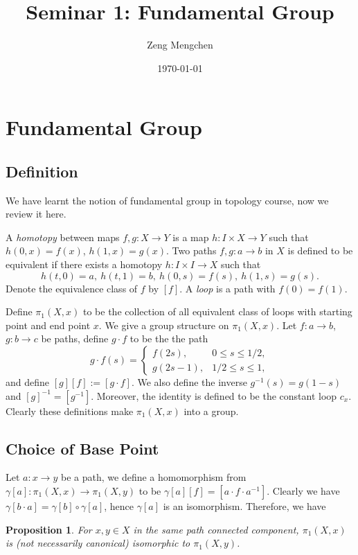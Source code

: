 \documentclass[a4paper]{amsart}
\title{Seminar 1: Fundamental Group}
\author{Zeng Mengchen}
\date{\today}
\theoremstyle{plain}
\newtheorem{prop}[thm]{Proposition}
\theoremstyle{definition}
\theoremstyle{remark}
\begin{document}
\maketitle

\section{Fundamental Group}

\subsection{Definition}
We have learnt the notion of fundamental group in topology course, now we review it here.

A \emph{homotopy} between maps $f,g:X\to Y$ is a map $h:I\times X\to Y$ such that $h(0,x)=f(x)$, $h(1,x)=g(x)$.
Two paths $f,g:a\to b$ in $X$ is defined to be equivalent if there exists a homotopy $h:I\times I\to X$ such that
\[h(t,0)=a,\ h(t,1)=b,\ h(0,s)=f(s),\ h(1,s)=g(s).\]
Denote the equivalence class of $f$ by $[f]$.
A \emph{loop} is a path with $f(0)=f(1)$.

Define $\pi_1(X,x)$ to be the collection of all equivalent class of loops with starting point and end point $x$.
We give a group structure on $\pi_1(X,x)$.
Let $f:a\to b$, $g:b\to c$ be paths, define $g\cdot f$ to be the the path
\[g\cdot f(s)=\begin{cases}
    f(2s), & 0\leq s\leq 1/2,\\
    g(2s-1), & 1/2\leq s\leq 1,
\end{cases}\]
and define $[g][f]:=[g\cdot f]$.
We also define the inverse $g^{-1}(s)=g(1-s)$ and $[g]^{-1}=[g^{-1}]$.
Moreover, the identity is defined to be the constant loop $c_x$.
Clearly these definitions make $\pi_1(X,x)$ into a group.

\subsection{Choice of Base Point}
Let $a:x\to y$ be a path, we define a homomorphism from $\gamma[a]:\pi_1(X,x)\to\pi_1(X,y)
$ to be $\gamma[a][f]=[a\cdot f\cdot a^{-1}]$.
Clearly we have $\gamma[b\cdot a]=\gamma[b]\circ\gamma[a]$, hence $\gamma[a]$ is an isomorphism.
Therefore, we have
\begin{prop}
    For $x,y\in X$ in the same path connected component, $\pi_1(X,x)$ is (not necessarily canonical) isomorphic to $\pi_1(X,y)$.
\end{prop}
\end{document}
